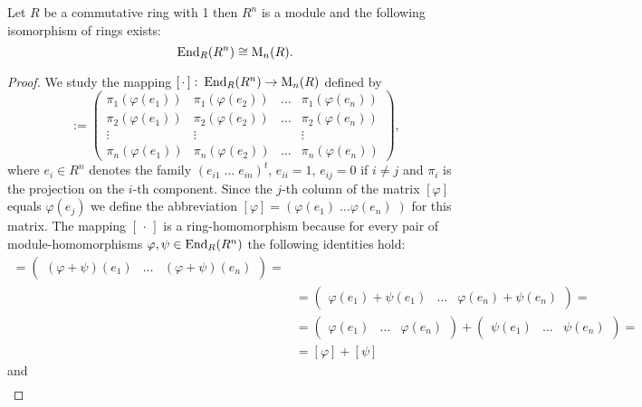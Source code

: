 \begin{pro}\label{prop.Matrix isomorph Homomorphism}
Let $R$ be a commutative ring with 1 then $R^n$ is a module and the following isomorphism of rings exists:
\begin{equation*}
\operatorname{\mathrm{End}}_R(R^n)\cong \mathrm{M}_n(R).
\end{equation*}
\end{pro}
\begin{proof}
We study the mapping $\left[\,\cdot\,\right]\colon\operatorname{\mathrm{End}}_R(R^n)\to\mathrm{M}_n(R)$ defined by
\begin{equation*}
[\varphi]:=
\begin{pmatrix}
\pi_1(\varphi(e_1)) & \pi_1(\varphi(e_2)) & \ldots & \pi_1(\varphi(e_n))\\
\pi_2(\varphi(e_1)) & \pi_2(\varphi(e_2)) & \ldots & \pi_2(\varphi(e_n))\\
\vdots &\vdots & &\vdots\\
\pi_n(\varphi(e_1)) & \pi_n(\varphi(e_2)) & \ldots & \pi_n(\varphi(e_n))
\end{pmatrix},
\end{equation*}
where $e_i\in R^n$ denotes the family $\left(e_{i1}\;\ldots\;e_{in}\right)^t$, $e_{ii}=1$, $e_{ij}=0$ if $i\neq j$ and $\pi_i$ is the projection on the $i$-th component. Since the $j$-th column of the matrix $[\varphi]$ equals $\varphi(e_j)$ we define the abbreviation $[\varphi]=\left(\varphi(e_1)\;\ldots\varphi(e_n)\;\right)$ for this matrix. The mapping $\left[\,\cdot\,\right]$ is a ring-homomorphism because for every pair of module-homomorphisms $\varphi,\psi\in\operatorname{\mathrm{End}}_R(R^n)$ the following identities hold:
\begin{align*}
[\varphi&+\psi]=\begin{pmatrix}(\varphi+\psi)(e_1) & \dots & (\varphi+\psi)(e_n)\end{pmatrix}=\\
    &=\begin{pmatrix}\varphi(e_1)+\psi(e_1) & \dots & \varphi(e_n)+\psi(e_n)\end{pmatrix}=\\
    &=\begin{pmatrix}\varphi(e_1) & \ldots & \varphi(e_n)\end{pmatrix}+\begin{pmatrix}\psi(e_1) & \ldots & \psi(e_n)\end{pmatrix}=\\
    &=[\varphi]+[\psi]
\end{align*}
and
\begin{align*}

\end{align*}
\end{proof}
